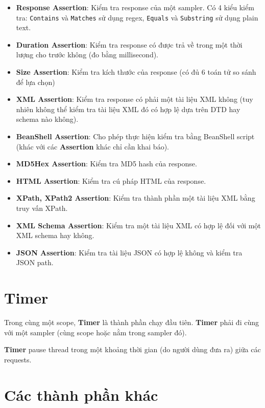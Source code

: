 \documentclass[12pt]{report}
\begin{document}
\begin{itemize}
    \item \textbf{Response Assertion}: Kiểm tra response của một sampler. Có 4 kiểu kiểm tra: \texttt{Contains} và \texttt{Matches} sử dụng regex, \texttt{Equals} và \texttt{Substring} sử dụng plain text.
    \item \textbf{Duration Assertion}: Kiểm tra response có được trả về trong một thời lượng cho trước không (đo bằng millisecond).
    \item \textbf{Size Assertion}: Kiểm tra kích thước của response (có đủ 6 toán tử so sánh để lựa chọn)
    \item \textbf{XML Assertion}: Kiểm tra response có phải một tài liệu XML không (tuy nhiên không thể kiểm tra tài liệu XML đó có hợp lệ dựa trên DTD hay schema nào không).
    \item \textbf{BeanShell Assertion}: Cho phép thực hiện kiểm tra bằng BeanShell script (khác với các \textbf{Assertion} khác chỉ cần khai báo).
    \item \textbf{MD5Hex Assertion}: Kiểm tra MD5 hash của response.
    \item \textbf{HTML Assertion}: Kiểm tra cú pháp HTML của response.
    \item \textbf{XPath, XPath2 Assertion}: Kiểm tra thành phần một tài liệu XML bằng truy vấn XPath.
    \item \textbf{XML Schema Assertion}: Kiểm tra một tài liệu XML có hợp lệ đối với một XML schema hay không.
    \item \textbf{JSON Assertion}: Kiểm tra tài liệu JSON có hợp lệ không và kiểm tra JSON path.
\end{itemize}

\section{Timer}

\par Trong cùng một scope, \textbf{Timer} là thành phần chạy đầu tiên. \textbf{Timer} phải đi cùng với một sampler (cùng scope hoặc nằm trong sampler đó).

\par \textbf{Timer} pause thread trong một khoảng thời gian (do người dùng đưa ra) giữa các requests.

\section{Các thành phần khác}
\end{document}
